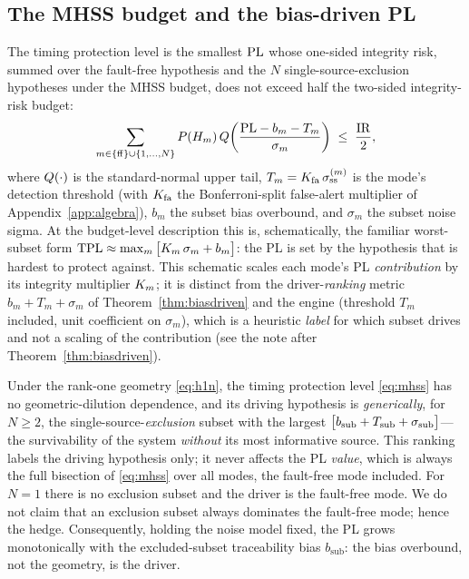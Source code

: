 \subsection{The MHSS budget and the bias-driven PL}
\label{sec:mhssbudget}

The timing protection level is the smallest $\mathrm{PL}$ whose one-sided integrity risk,
summed over the fault-free hypothesis and the $N$ single-source-exclusion
hypotheses under the MHSS budget, does not exceed half the two-sided integrity-risk
budget:
\begin{equation}
  \sum_{m\in\{\mathrm{ff}\}\cup\{1,\dots,N\}}
  P(H_m)\,Q\!\left(\frac{\mathrm{PL}-b_m-T_m}{\sigma_m}\right)\;\le\;\frac{\mathrm{IR}}{2},
  \label{eq:mhss}
\end{equation}
where $Q(\cdot)$ is the standard-normal upper tail, $T_m=K_{\mathrm{fa}}\,
\sigma_{\mathrm{ss}}^{(m)}$ is the mode's detection threshold (with $K_{\mathrm{fa}}$ the
Bonferroni-split false-alert multiplier of Appendix~\ref{app:algebra}), $b_m$ the
subset bias overbound, and $\sigma_m$ the subset noise sigma. At the budget-level
description this is, schematically, the familiar worst-subset form
$\mathrm{TPL}\approx\max_m\big[K_m\,\sigma_m+b_m\big]$: the PL is set by the hypothesis
that is hardest to protect against. This schematic scales each mode's PL
\emph{contribution} by its integrity multiplier $K_m$; it is distinct from the
driver-\emph{ranking} metric $b_m+T_m+\sigma_m$ of Theorem~\ref{thm:biasdriven} and
the engine (threshold $T_m$ included, unit coefficient on $\sigma_m$), which is a
heuristic \emph{label} for which subset drives and not a scaling of the contribution
(see the note after Theorem~\ref{thm:biasdriven}).

\begin{theorem}
\label{thm:biasdriven}
Under the rank-one geometry \eqref{eq:h1n}, the timing protection level
\eqref{eq:mhss} has no geometric-dilution dependence, and its driving hypothesis is
\emph{generically}, for $N\ge2$, the single-source-\emph{exclusion} subset with the
largest $\big[b_{\mathrm{sub}}+T_{\mathrm{sub}}+\sigma_{\mathrm{sub}}\big]$---the survivability of
the system \emph{without} its most informative source. This ranking labels the
driving hypothesis only; it never affects the PL \emph{value}, which is always the
full bisection of \eqref{eq:mhss} over all modes, the fault-free mode included. For
$N=1$ there is no exclusion subset and the driver is the fault-free mode. We do not
claim that an exclusion subset always dominates the fault-free mode; hence the
hedge. Consequently, holding the noise model fixed, the PL grows monotonically with
the excluded-subset traceability bias $b_{\mathrm{sub}}$: the bias overbound, not
the geometry, is the driver.
\end{theorem}


